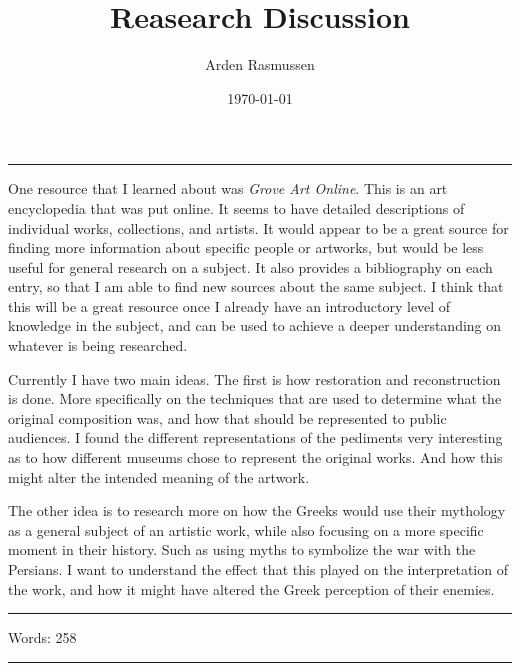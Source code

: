 \documentclass[12pt]{amsart}
\title{Reasearch Discussion}
\author{Arden Rasmussen}
\date{\today}
\begin{document}
\maketitle

\par\noindent\rule{\textwidth}{0.4pt}

One resource that I learned about was \textit{Grove Art Online}. This is an
art encyclopedia that was put online. It seems to have detailed descriptions of
individual works, collections, and artists. It would appear to be a great
source for finding more information about specific people or artworks, but
would be less useful for general research on a subject. It also provides a
bibliography on each entry, so that I am able to find new sources about the
same subject. I think that this will be a great resource once I already have an
introductory level of knowledge in the subject, and can be used to achieve a
deeper understanding on whatever is being researched.

Currently I have two main ideas. The first is how restoration and
reconstruction is done. More specifically on the techniques that are used to
determine what the original composition was, and how that should be represented
to public audiences. I found the different representations of the pediments
very interesting as to how different museums chose to represent the original
works. And how this might alter the intended meaning of the artwork.

The other idea is to research more on how the Greeks would use their mythology
as a general subject of an artistic work, while also focusing on a more
specific moment in their history. Such as using myths to symbolize the war with
the Persians. I want to understand the effect that this played on the
interpretation of the work, and how it might have altered the Greek perception
of their enemies.

\par\noindent\rule{\textwidth}{0.4pt}
Words: 258
\par\noindent\rule{\textwidth}{0.4pt}
\end{document}
